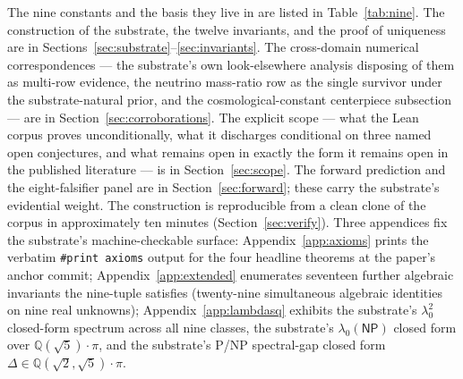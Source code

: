 \documentclass[11pt,a4paper]{amsart}
\theoremstyle{plain}
\theoremstyle{definition}
\begin{document}
The nine constants and the basis they live in are listed in Table~\ref{tab:nine}. The construction of the substrate, the twelve invariants, and the proof of uniqueness are in Sections~\ref{sec:substrate}--\ref{sec:invariants}. The cross-domain numerical correspondences --- the substrate's own look-elsewhere analysis disposing of them as multi-row evidence, the neutrino mass-ratio row as the single survivor under the substrate-natural prior, and the cosmological-constant centerpiece subsection --- are in Section~\ref{sec:corroborations}. The explicit scope --- what the Lean corpus proves unconditionally, what it discharges conditional on three named open conjectures, and what remains open in exactly the form it remains open in the published literature --- is in Section~\ref{sec:scope}. The forward prediction and the eight-falsifier panel are in Section~\ref{sec:forward}; these carry the substrate's evidential weight. The construction is reproducible from a clean clone of the corpus in approximately ten minutes (Section~\ref{sec:verify}). Three appendices fix the substrate's machine-checkable surface: Appendix~\ref{app:axioms} prints the verbatim \texttt{\#print axioms} output for the four headline theorems at the paper's anchor commit; Appendix~\ref{app:extended} enumerates seventeen further algebraic invariants the nine-tuple satisfies (twenty-nine simultaneous algebraic identities on nine real unknowns); Appendix~\ref{app:lambdasq} exhibits the substrate's $\lambda_0^2$ closed-form spectrum across all nine classes, the substrate's $\lambda_0(\textsf{NP})$ closed form over $\mathbb{Q}(\sqrt{5})\cdot\pi$, and the substrate's P/NP spectral-gap closed form $\Delta \in \mathbb{Q}(\sqrt{2}, \sqrt{5})\cdot\pi$.
\end{document}

